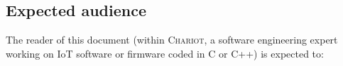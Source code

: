 \begin{table}
\begin{relsize}{-1.3}
\begin{tabular}{|p{}|p{}|p{}|p{}|}
       
      
    \end{tabular}
 \end{relsize}
\end{table}

\subsection{Expected audience}
\label{subsec:audience}

The reader of this document (within \textsc{Chariot}, a software
engineering expert working on IoT software or firmware coded in C or
C++) is expected to:

